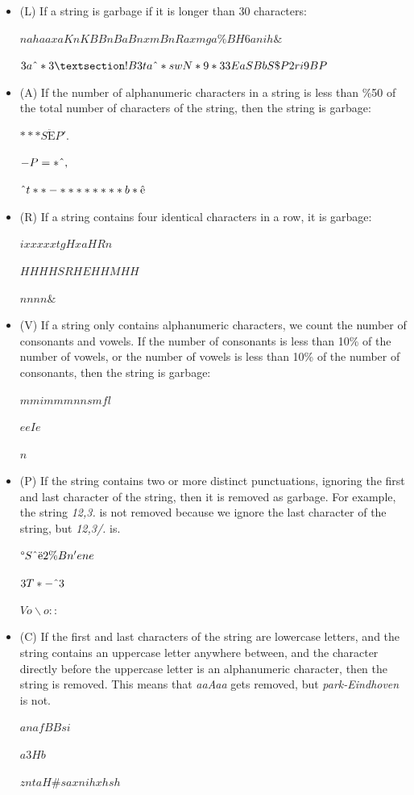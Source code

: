 \documentclass[a4paper, 10pt, conference]{ieeeconf}      %
\begin{document}
\begin{itemize}
\item (L) If a string is garbage if it is longer than 30 characters:

\textit{$nahaaxaKnKBBnBaBnxmBnRaxmga\%BH6anih\&$} 

\textit{$3a\char`\^*3§!B3ta\char`\^\ast swN\ast9\ast33EaSBbS\$P2ri9BP$}

\item (A) If the number of alphanumeric characters in a string is less than \%50 of the total number of characters of the string, then the string is garbage:

\textit{$\ast\ast\ast S\ddot{\mathrm{E}}P'.$}

\textit{$-P=\ast\char`\^,$}

\textit{$\char`\^t**-********b\ast\hat{\mathrm{e}}$}

\item (R) If a string contains four identical characters in a row, it is garbage:

\textit{$ixxxxxtgHxaHRn$}

\textit{$HHHHSRHEHHMHH$}

\textit{$nnnn\&$}

\item (V) If a string only contains alphanumeric characters, we count the number of consonants and vowels. If the number of consonants is less than 10\% of the number of vowels, or the number of vowels is less than 10\% of the number of consonants, then the string is garbage:

\textit{$mmimmmnnsmfl$}

\textit{$eeIe$}

\textit{$n$}

\item (P) If the string contains two or more distinct punctuations, ignoring the first and last character of the string, then it is removed as garbage. For example, the string \textit{12,3.} is not removed because we ignore the last character of the string, but \textit{12,3/.} is.

\textit{$\degree S\char`\^\ddot{\mathrm{e}}2\%Bn'ene$}

\textit{$3T\ast-\char`\^3$}

\textit{$Vo\backslash o::$}

\item (C) If the first and last characters of the string are lowercase letters, and the string contains an uppercase letter anywhere between, and the character directly before the uppercase letter is an alphanumeric character, then the string is removed. This means that \textit{aaAaa} gets removed, but \textit{park-Eindhoven} is not.

\textit{$anafBBsi$}

\textit{$a3Hb$}

\textit{$zntaH\#saxnihxhsh$}

\end{itemize}
\end{document}
